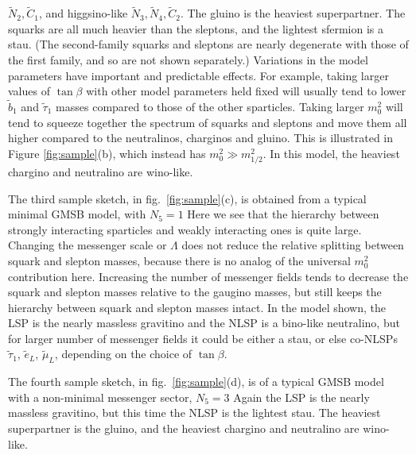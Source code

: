 \documentclass[11pt]{article}
\def\stilde{\widetilde}
\begin{document}
$\stilde N_2, \stilde C_1$, and higgsino-like $\stilde N_3, \stilde N_4,
\stilde C_2$. The gluino is the heaviest superpartner. The squarks are
all much heavier than the sleptons, and the lightest sfermion is a stau.
(The second-family squarks and sleptons are nearly degenerate with those of the first family, and so are not shown separately.) 
Variations in the model 
parameters have important and predictable effects. For example, 
taking larger values of $\tan\beta$ with other model parameters 
held fixed will usually tend to lower $\stilde b_1$ and $\stilde \tau_1$ 
masses compared to those of the other sparticles. 
Taking
larger $m_0^2$ will tend to  
squeeze together the spectrum of squarks and sleptons and move 
them all higher compared to the 
neutralinos, charginos and 
gluino. This is illustrated in Figure \ref{fig:sample}(b), which instead has
$m_0^2 \gg m_{1/2}^2$. 
In this model, the heaviest chargino and neutralino are wino-like.

The third sample sketch, in fig.~\ref{fig:sample}(c), is obtained from a 
typical minimal GMSB model, with $N_5 = 1$ 
Here we see that the hierarchy between 
strongly interacting sparticles and weakly interacting ones is quite 
large. Changing the messenger scale or $\Lambda$ does not reduce the 
relative splitting between squark and slepton masses, because there is no 
analog of the universal $m_0^2$ contribution here. Increasing the number 
of messenger fields tends to decrease the squark and slepton masses 
relative to the gaugino masses, but still keeps the hierarchy between 
squark and slepton masses intact. In the model shown, the LSP is the 
nearly massless gravitino and the NLSP is a 
bino-like neutralino, but for larger number of messenger fields it could 
be either a stau, or else co-NLSPs $\tilde \tau_1$, $\tilde e_L$, $\tilde 
\mu_L$, depending on the choice of $\tan\beta$.

The fourth sample sketch, in fig.~\ref{fig:sample}(d), 
is of a typical GMSB model with a non-minimal messenger sector, $N_5=3$
Again the LSP is the nearly massless gravitino, but this 
time the NLSP is the lightest stau. The heaviest superpartner is the gluino, and the 
heaviest chargino and neutralino
are wino-like.
\end{document}
